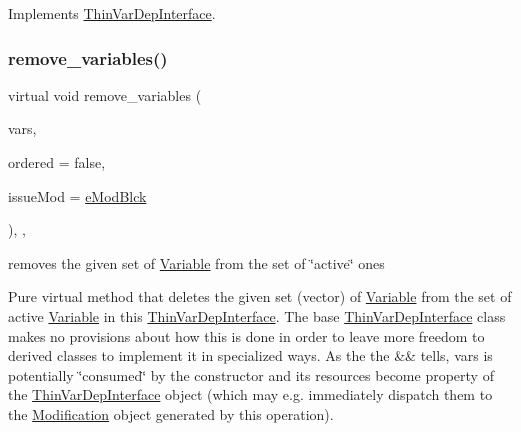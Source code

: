 Implements \mbox{\hyperlink{group___thin_var_dep_interface___c_l_a_s_s_e_s_gad6726141a0cbe6a0410a2b396809dade}{Thin\+Var\+Dep\+Interface}}.

\mbox{\label{class_s_m_spp__di__unipi__it_1_1_f_real_objective_a46c11bb15648f9976eee469c53099b11}} 
\subsubsection{\texorpdfstring{remove\+\_\+variables()}{remove\_variables()}}
{\footnotesize\ttfamily virtual void remove\+\_\+variables (\begin{DoxyParamCaption}\item[{std\+::vector$<$ \mbox{\hyperlink{class_s_m_spp__di__unipi__it_1_1_variable}{Variable}} $\ast$$>$ \&\&}]{vars,  }\item[{const bool}]{ordered = {\ttfamily false},  }\item[{\mbox{\hyperlink{group___modification___t_y_p_e_s_ga544246d8c462e9a2d817c2c30797968f}{c\+\_\+\+Mod\+Param}}}]{issue\+Mod = {\ttfamily \mbox{\hyperlink{group___modification___t_y_p_e_s_gga48fddcdd03a03f49b7e389ca1ed938d4a21b14b26b1c0093a0905f6fc010bad29}{e\+Mod\+Blck}}} }\end{DoxyParamCaption})\hspace{0.3cm}{\ttfamily [inline]}, {\ttfamily [override]}, {\ttfamily [virtual]}}



removes the given set of \mbox{\hyperlink{class_s_m_spp__di__unipi__it_1_1_variable}{Variable}} from the set of \char`\"{}active\char`\"{} ones 

Pure virtual method that deletes the given set (vector) of \mbox{\hyperlink{class_s_m_spp__di__unipi__it_1_1_variable}{Variable}} from the set of active \mbox{\hyperlink{class_s_m_spp__di__unipi__it_1_1_variable}{Variable}} in this \mbox{\hyperlink{class_s_m_spp__di__unipi__it_1_1_thin_var_dep_interface}{Thin\+Var\+Dep\+Interface}}. The base \mbox{\hyperlink{class_s_m_spp__di__unipi__it_1_1_thin_var_dep_interface}{Thin\+Var\+Dep\+Interface}} class makes no provisions about how this is done in order to leave more freedom to derived classes to implement it in specialized ways. As the the \&\& tells, vars is potentially \char`\"{}consumed\char`\"{} by the constructor and its resources become property of the \mbox{\hyperlink{class_s_m_spp__di__unipi__it_1_1_thin_var_dep_interface}{Thin\+Var\+Dep\+Interface}} object (which may e.\+g. immediately dispatch them to the \mbox{\hyperlink{class_s_m_spp__di__unipi__it_1_1_modification}{Modification}} object generated by this operation).

